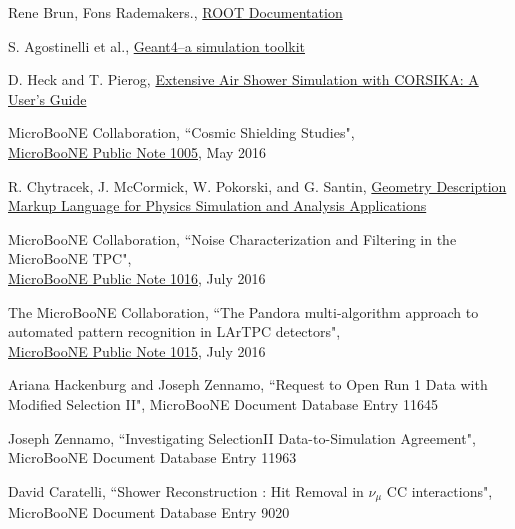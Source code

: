 \begin{thebibliography}{20}
  Rene Brun, Fons Rademakers., \href{https://root.cern/documentation}{ROOT Documentation}
  
  S. Agostinelli et al., \href{http://www.sciencedirect.com/science/article/pii/S0168900203013688}{Geant4--a simulation toolkit}
  
  D. Heck and T. Pierog, \href{https://web.ikp.kit.edu/corsika/usersguide/usersguide.pdf}{Extensive Air Shower Simulation with CORSIKA: A User's Guide}
  
  MicroBooNE Collaboration, ``Cosmic Shielding Studies",\\
 \href{http://microboone.fnal.gov/wp-content/uploads/MICROBOONE-NOTE-1005-PUB.pdf}{MicroBooNE Public Note 1005}, May 2016 
  
  
  R. Chytracek, J. McCormick, W. Pokorski, and G. Santin, \href{http://ieeexplore.ieee.org/document/1710291}{Geometry Description Markup Language for Physics Simulation and Analysis Applications}

  MicroBooNE Collaboration, ``Noise Characterization and Filtering in the MicroBooNE TPC",\\
 \href{http://microboone.fnal.gov/wp-content/uploads/MICROBOONE-NOTE-1016-PUB.pdf}{MicroBooNE Public Note 1016}, July 2016

  The MicroBooNE Collaboration, ``The Pandora multi-algorithm approach to automated pattern recognition in LArTPC detectors",\\
 \href{http://microboone.fnal.gov/wp-content/uploads/MICROBOONE-NOTE-1015-PUB.pdf}{MicroBooNE Public Note 1015}, July 2016

%

 Ariana Hackenburg and Joseph Zennamo, ``Request to Open Run 1 Data with Modified Selection II", MicroBooNE Document Database Entry 11645

 Joseph Zennamo, ``Investigating SelectionII Data-to-Simulation Agreement",\\ MicroBooNE Document Database Entry 11963
 

  David Caratelli, ``Shower Reconstruction : Hit Removal in $\nu_{\mu}$ CC interactions",\\ MicroBooNE Document Database Entry 9020


\end{thebibliography}
